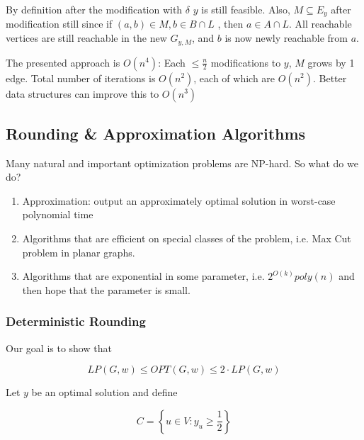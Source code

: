 \documentclass[../notes.tex]{subfiles}
\begin{document}
By definition after the modification with $ \delta $ $ y $ is still feasible. Also, $ M \subseteq E_y $ after modification still since if $ (a,b) \in M, b \in B \cap L   $ , then $ a \in A \cap L $.
All reachable vertices are still reachable in the new $ G_{y, M}$, and $ b $ is now newly reachable from $ a $.


The presented approach is $ O(n^4) $: Each $ \le \frac{n}{2} $ modifications to $ y $, $ M  $ grows by 1 edge. Total number of iterations is $ O(n^2) $, each of which are $ O(n^2) $. Better data structures can improve this to $ O(n^3) $











\subsection{Rounding \& Approximation Algorithms}

Many natural and important optimization problems are NP-hard. So what do we do? 

\begin{enumerate}
    \item Approximation: output an approximately optimal solution in worst-case polynomial time
    \item Algorithms that are efficient on special classes of the problem, i.e. Max Cut problem in planar graphs.
    \item Algorithms that are exponential in some parameter, i.e. $ 2^{O(k)} poly(n) $ and then hope that the parameter is small.
\end{enumerate}

\subsubsection{Deterministic Rounding}
Our goal is to show that 

\begin{equation} 
    LP(G, w) \le OPT(G, w) \le 2 \cdot  LP(G, w)
\end{equation}

Let $ y $ be an optimal solution and define

\begin{equation}
    C = \left\{  u \in V : y_u \ge  \frac{1}{2} \right\} 
\end{equation}
\end{document}
